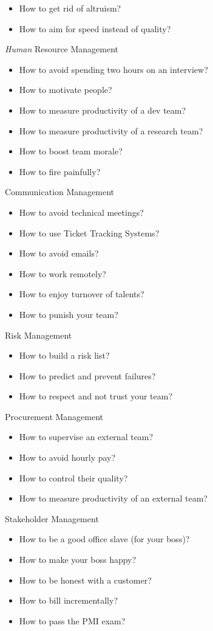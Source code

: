 \documentclass[nobrand,anonymous,nodate,nosecurity]{huawei}
\renewcommand\emph[1]{\textit{#1}}
\begin{document}
{\begin{lectures}
\begin{itemize}
    \item How to get rid of altruism?
    \item How to aim for speed instead of quality?
    \end{itemize}
\item \emph{Human} Resource Management
    \begin{itemize}
    \item How to avoid spending two hours on an interview?
    \item How to motivate people?
    \item How to measure productivity of a dev team?
    \item How to measure productivity of a research team?
    \item How to boost team morale?
    \item How to fire painfully?
    \end{itemize}
\item Communication Management
    \begin{itemize}
    \item How to avoid technical meetings?
    \item How to use Ticket Tracking Systems?
    \item How to avoid emails?
    \item How to work remotely?
    \item How to enjoy turnover of talents?
    \item How to punish your team?
    \end{itemize}
\item Risk Management
    \begin{itemize}
    \item How to build a risk list?
    \item How to predict and prevent failures?
    \item How to respect and not trust your team?
    \end{itemize}
\item Procurement Management
    \begin{itemize}
    \item How to supervise an external team?
    \item How to avoid hourly pay?
    \item How to control their quality?
    \item How to measure productivity of an external team?
    \end{itemize}
\item Stakeholder Management
    \begin{itemize}
    \item How to be a good office slave (for your boss)?
    \item How to make your boss happy?
    \item How to be honest with a customer?
    \item How to bill incrementally?
    \item How to pass the PMI exam?
    \end{itemize}
\end{lectures}

}
\end{document}

